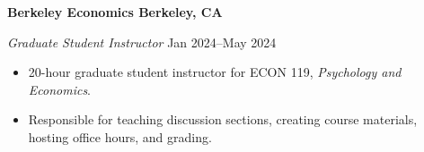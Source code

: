 \textbf{Berkeley Economics \hfill Berkeley, CA} \par
\textit{Graduate Student Instructor} \hfill Jan 2024--May 2024 \par
\begin{itemize}
	\item 20-hour graduate student instructor for ECON 119, \textit{Psychology and Economics}.
	\item Responsible for teaching discussion sections, creating course materials, hosting office hours, and grading.
\end{itemize}\par